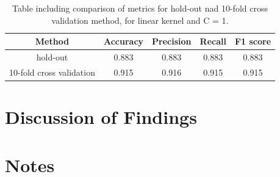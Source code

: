 \documentclass{article}
\begin{document}
\begin{table}[h!]
\centering
\begin{tabular}{||c c c c c||} 
 \hline
Method &  Accuracy & Precision & Recall & F1 score \\ [0.5ex] 
 \hline\hline
hold-out & 0.883 & 0.883 & 0.883 & 0.883  \\  
 10-fold cross validation &  0.915&  0.916 & 0.915& 0.915 \\ [1ex] 
 \hline
\end{tabular}
\caption{Table including comparison of metrics for hold-out nad 10-fold cross validation method, for linear kernel and C = 1.}
\label{table:machine_SVM_cross}
\end{table}

\section{Discussion of Findings}

\section{Notes}
\end{document}

